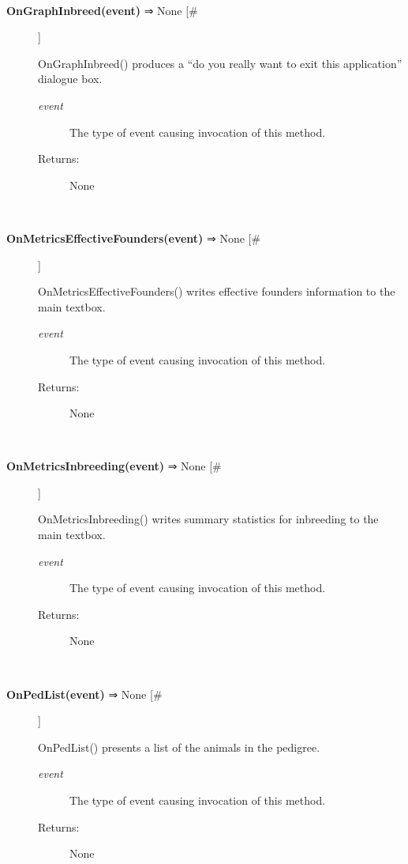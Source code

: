 \documentclass[10pt]{article}
\begin{document}
\begin{description}
\begin{description}
\end{description}
\\ 

\item[\textbf{OnGraphInbreed(event)}
 ⇒ None [\#]]

 OnGraphInbreed() produces a ``do you really want to exit this application'' dialogue box.
\begin{description}
\item[\emph{event}
] The type of event causing invocation of this method.
\item[Returns:] None

\end{description}
\\ 

\item[\textbf{OnMetricsEffectiveFounders(event)}
 ⇒ None [\#]]

 OnMetricsEffectiveFounders() writes effective founders information to the main textbox.
\begin{description}
\item[\emph{event}
] The type of event causing invocation of this method.
\item[Returns:] None

\end{description}
\\ 

\item[\textbf{OnMetricsInbreeding(event)}
 ⇒ None [\#]]

 OnMetricsInbreeding() writes summary statistics for inbreeding to the main textbox.
\begin{description}
\item[\emph{event}
] The type of event causing invocation of this method.
\item[Returns:] None

\end{description}
\\ 

\item[\textbf{OnPedList(event)}
 ⇒ None [\#]]

 OnPedList() presents a list of the animals in the pedigree.
\begin{description}
\item[\emph{event}
] The type of event causing invocation of this method.
\item[Returns:] None

\end{description}
\\ 


\end{description}
\end{document}

